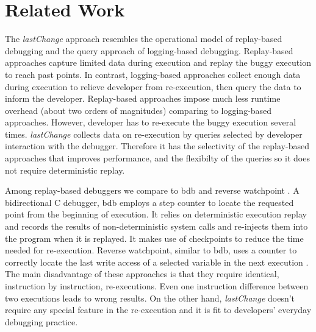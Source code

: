 \documentclass{sig-alternate}
\begin{document}
\section{Related Work}
\label{sec:relatedWork}
The \textit{lastChange} approach resembles the operational model of replay-based debugging 
and the query approach of logging-based
debugging.  Replay-based approaches capture limited data during
execution and replay the buggy execution to reach past points. In
contrast, logging-based approaches collect enough data during
execution to relieve developer from re-execution, then query the data to 
inform the developer. Replay-based
approaches impose much less runtime overhead (about two orders of
magnitudes) comparing to logging-based approaches. However, developer
has to re-execute the buggy execution several
times. \textit{lastChange} collects data on re-execution by queries
selected by developer interaction with the debugger. Therefore it has 
the selectivity of the replay-based approaches that improves performance, 
and the flexibilty of the queries so it does not require deterministic replay.

Among replay-based debuggers we compare to bdb \cite{Boothe} and
reverse watchpoint \cite{Maruyama}.  A bidirectional C debugger, bdb
employs a step counter to locate the requested point from the
beginning of execution. It relies on deterministic execution replay
and records the results of non-deterministic system calls and re-injects them into
the program when it is replayed. It makes use of checkpoints to reduce
the time needed for re-execution. Reverse watchpoint, similar to bdb, uses
a counter to correctly locate the last write access of a selected variable in the
next execution \cite{Maruyama}.
The main disadvantage of these approaches is that they require 
identical, instruction by instruction, re-executions. %
Even one instruction difference between
two executions leads to wrong results. On the other hand,
\textit{lastChange} doesn't require any special feature in the
re-execution and it is fit to developers' everyday debugging
practice.
\end{document}
